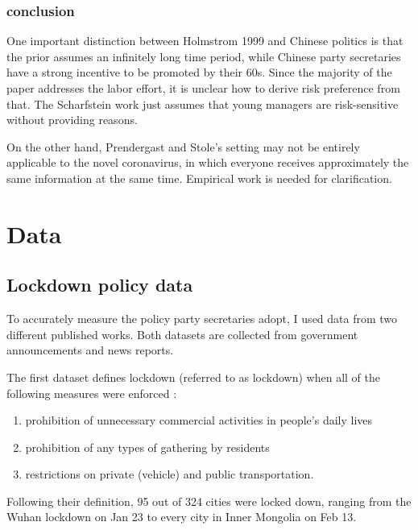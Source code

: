 \documentclass{article}
\begin{document}
\begin{CJK}{UTF8}{gbsn}


\subsubsection{conclusion}

One important distinction between Holmstrom 1999 and Chinese politics is that the prior assumes an infinitely long time period, while Chinese party secretaries have a strong incentive to be promoted by their 60s. Since the majority of the paper addresses the labor effort, it is unclear how to derive risk preference from that. The Scharfstein work just assumes that young managers are risk-sensitive without providing reasons.

On the other hand, Prendergast and Stole's setting may not be entirely applicable to the novel coronavirus, in which everyone receives approximately the same information at the same time. Empirical work is needed for clarification.



\section{Data}

\subsection{Lockdown policy data} 

To accurately measure the policy party secretaries adopt, I used data from two different published works. Both datasets are collected from government announcements and news reports. 

The first dataset defines lockdown (referred to as lockdown) when all of the following measures were enforced \cite{yuhang}:

\begin{enumerate}
  \item prohibition of unnecessary commercial activities in people’s daily lives
  \item prohibition of any types of gathering by residents
  \item restrictions on private (vehicle) and public transportation. 
\end{enumerate}
Following their definition, 95 out of 324 cities were locked down, ranging from the Wuhan lockdown on Jan 23 to every city in Inner Mongolia on Feb 13. 



\end{CJK}
\end{document}
